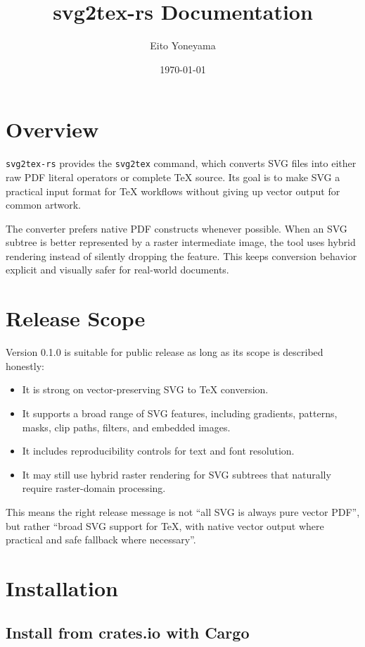 \documentclass[11pt,a4paper]{article}
\title{svg2tex-rs Documentation}
\author{Eito Yoneyama}
\date{\today}
\begin{document}
\maketitle

\section{Overview}

\texttt{svg2tex-rs} provides the \texttt{svg2tex} command, which converts SVG files into either raw PDF literal operators or complete TeX source.
Its goal is to make SVG a practical input format for TeX workflows without giving up vector output
for common artwork.

The converter prefers native PDF constructs whenever possible. When an SVG subtree is better
represented by a raster intermediate image, the tool uses hybrid rendering instead of silently
dropping the feature. This keeps conversion behavior explicit and visually safer for real-world
documents.

\section{Release Scope}

Version 0.1.0 is suitable for public release as long as its scope is described honestly:

\begin{itemize}
\item It is strong on vector-preserving SVG to TeX conversion.
\item It supports a broad range of SVG features, including gradients, patterns, masks, clip paths,
filters, and embedded images.
\item It includes reproducibility controls for text and font resolution.
\item It may still use hybrid raster rendering for SVG subtrees that naturally require raster-domain
processing.
\end{itemize}

This means the right release message is not ``all SVG is always pure vector PDF'', but rather
``broad SVG support for TeX, with native vector output where practical and safe fallback where
necessary''.

\section{Installation}

\subsection{Install from crates.io with Cargo}
\end{document}
